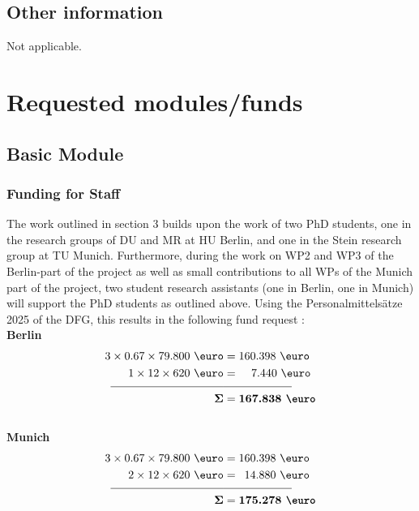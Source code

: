 \documentclass[a4paper,11pt,headings=normal]{scrartcl}
\newcommand{\ehl}{\color{black}}
\begin{document}
\begin{itemize}
\subsection{Other information}
Not applicable. 

\section{Requested modules/funds}
\subsection{Basic Module}
\subsubsection{Funding for Staff}
The work outlined in section 3 builds upon the work of two PhD students, one in 
the research groups of DU and MR at HU Berlin, and one in the Stein research 
group at TU Munich. Furthermore, during the work on WP2 and WP3 of the 
Berlin-part of the project as well as small contributions to all WPs of the Munich part of the project, 
two student research assistants (one in Berlin, one in Munich) will support the 
PhD students as outlined above. Using the Personalmittelsätze 2025 of the DFG, 
this results in the following fund request :\\
\textbf{Berlin}
\begin{align*}
	\text{3} \times 0.67 \times \text{79.800  \euro} &=  \text{160.398 \euro}\\
	\text{1} \times \text{12} \times \text{620 \euro} &=  \hspace{1.1em}\text{7.440 
	\euro} 
	\\[-0.75em]
\underline{\hspace{3.5cm}}&\underline{\qquad \qquad \qquad}\\
	\mathbf{\Sigma} &= \textbf{167.838 \euro} 
\end{align*}
\ \\
\noindent
\textbf{Munich}
\begin{align*}
	\text{3} \times 0.67 \times \text{79.800 \euro} &=  \text{160.398	\euro}\\
  \text{2} \times \text{12} \times \text{620 \euro} &= \hspace{0.5em}
  \text{14.880	\euro}\\[-0.75em]\ehl
\underline{\hspace{3.5cm}}&\underline{\qquad \qquad \qquad}\\
\mathbf{\Sigma} &= \textbf{175.278 \euro}
\end{align*}



\end{itemize}
\end{document}
